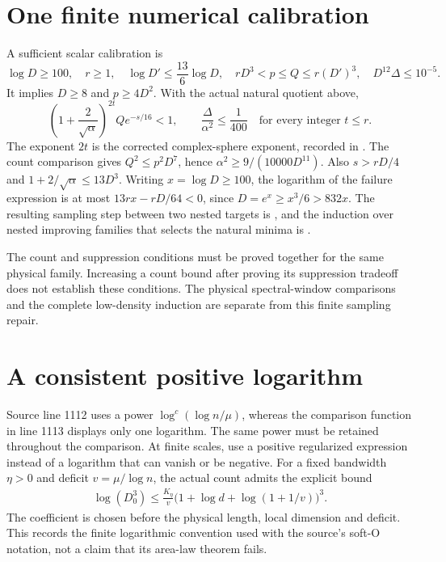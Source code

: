 \documentclass{article}
\begin{document}
\section{One finite numerical calibration}

A sufficient scalar calibration is
\[
 \log D\ge100,\quad r\ge1,\quad
 \log D'\le\frac{13}{6}\log D,\quad
 rD^3<p\le Q\le r(D')^3,\quad D^{12}\Delta\le10^{-5}.
\]
It implies $D\ge8$ and $p\ge4D^2$. With the actual natural quotient above,
\[
 \left(1+\frac2{\sqrt\alpha}\right)^{2t}Qe^{-s/16}<1,
 \qquad \frac{\Delta}{\alpha^2}\le\frac1{400}
 \quad\text{for every integer }t\le r.
\]
The exponent $2t$ is the corrected complex-sphere exponent, recorded in
.
The count comparison gives $Q^2\le p^2D^7$, hence
$\alpha^2\ge9/(10000D^{11})$. Also $s>rD/4$ and
$1+2/\sqrt\alpha\le13D^3$. Writing $x=\log D\ge100$, the logarithm
of the failure expression is at most $13rx-rD/64<0$, since
$D=e^x\ge x^3/6>832x$. The resulting sampling step between two nested
targets is ,
and the induction over nested improving families that selects the natural
minima is .

The count and suppression conditions must be proved together for the same
physical family. Increasing a count bound after proving its suppression
tradeoff does not establish these conditions. The physical spectral-window
comparisons and the complete low-density induction are separate from this
finite sampling repair.

\section{A consistent positive logarithm}

Source line 1112 uses a power $\log^c(\log n/\mu)$, whereas the
comparison function in line 1113 displays only one logarithm. The same
power must be retained throughout the comparison. At finite scales,
use a positive regularized expression instead of a logarithm that can
vanish or be negative. For a fixed bandwidth $\eta>0$ and deficit
$v=\mu/\log n$, the actual count admits the explicit bound
\begin{align*}
 \log(D_0^3)\le \frac{K_\eta}{v}
     \bigl(1+\log d+\log(1+1/v)\bigr)^3.
\end{align*}
The coefficient is chosen before the physical length, local dimension
and deficit. This records the finite logarithmic convention used with
the source's soft-O notation, not a claim that its area-law theorem fails.
\end{document}
